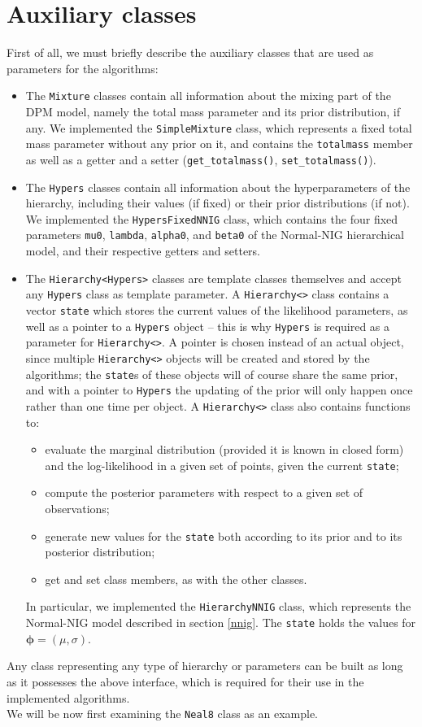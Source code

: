\section{Auxiliary classes}
First of all, we must briefly describe the auxiliary classes that are used as parameters for the algorithms:
\begin{itemize}
	\item The \verb|Mixture| classes contain all information about the mixing part of the DPM model, namely the total mass parameter and its prior distribution, if any.
	We implemented the \verb|SimpleMixture| class, which represents a fixed total mass parameter without any prior on it, and contains the \verb|totalmass| member as well as a getter and a setter (\verb|get_totalmass()|, \verb|set_totalmass()|).
	\item The \verb|Hypers| classes contain all information about the hyperparameters of the hierarchy, including their values (if fixed) or their prior distributions (if not).
	We implemented the \verb|HypersFixedNNIG| class, which contains the four fixed parameters \verb|mu0|, \verb|lambda|, \verb|alpha0|, and \verb|beta0| of the Normal-NIG hierarchical model, and their respective getters and setters.
	\item The \verb|Hierarchy<Hypers>| classes are template classes themselves and accept any \verb|Hypers| class as template parameter.
	A \verb|Hierarchy<>| class contains a vector \verb|state| which stores the current values of the likelihood parameters, as well as a pointer to a \verb|Hypers| object -- this is why \verb|Hypers| is required as a parameter for \verb|Hierarchy<>|.
	A pointer is chosen instead of an actual object, since multiple \verb|Hierarchy<>| objects will be created and stored by the algorithms; the \verb|state|s of these objects will of course share the same prior, and with a pointer to \verb|Hypers| the updating of the prior will only happen once rather than one time per object.
	A \verb|Hierarchy<>| class also contains functions to:
	\begin{itemize}
		\item evaluate the marginal distribution (provided it is known in closed form) and the log-likelihood in a given set of points, given the current \verb|state|;
		\item compute the posterior parameters with respect to a given set of observations;
		\item generate new values for the \verb|state| both according to its prior and to its posterior distribution;
		\item get and set class members, as with the other classes.
	\end{itemize}
	In particular, we implemented the \verb|HierarchyNNIG| class, which represents the Normal-NIG model described in section \ref{nnig}.
	The \verb|state| holds the values for $\boldsymbol\phi = (\mu,\sigma)$.
\end{itemize}
Any class representing any type of hierarchy or parameters can be built as long as it possesses the above interface, which is required for their use in the implemented algorithms. \\
We will be now first examining the \verb|Neal8| class as an example.

